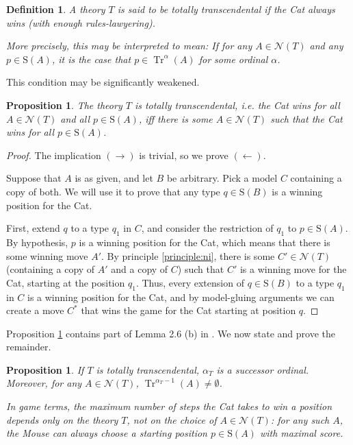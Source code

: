 \documentclass{article}
\newtheorem{prop}[theorem]{Proposition}
\newtheorem{definition}[theorem]{Definition}
\theoremstyle{nonumberplain}
\newtheorem{proof}{Proof}
\newcommand{\calN}{\mathcal{N}}
\newcommand{\Stone}{\mathrm{S}}
\DeclareMathOperator{\Tr}{Tr}
\begin{document}
\begin{definition}
A theory $T$ is said to be \emph{totally transcendental} if the Cat always wins (with enough rules-lawyering).

More precisely, this may be interpreted to mean: If for any $A \in \calN(T)$ and any $p \in \Stone(A)$, it is the case that $p \in \Tr^\alpha(A)$ for some ordinal $\alpha$.
\end{definition}

This condition may be significantly weakened.

\begin{prop}\label{prop:weaktt}
The theory $T$ is totally transcendental, i.e. the Cat wins for all $A \in \calN(T)$ and all $p \in \Stone(A)$, iff there is some $A \in \calN(T)$ such that the Cat wins for all $p \in \Stone(A)$.
\end{prop}

\begin{proof}
The implication $(\rightarrow)$ is trivial, so we prove $(\leftarrow)$.

Suppose that $A$ is as given, and let $B$ be arbitrary. Pick a model $C$ containing a copy of both. We will use it to prove that any type $q \in \Stone(B)$ is a winning position for the Cat.

First, extend $q$ to a type $q_1$ in $C$, and consider the restriction of $q_1$ to $p \in \Stone(A)$. By hypothesis, $p$ is a winning position for the Cat, which means that there is some winning move $A'$. By principle \ref{principle:ni}, there is some $C' \in \calN(T)$ (containing a copy of $A'$ and a copy of $C$) such that $C'$ is a winning move for the Cat, starting at the position $q_1$. Thus, every extension of $q \in \Stone(B)$ to a type $q_1$ in $C$ is a winning position for the Cat, and by model-gluing arguments we can create a move $C^*$ that wins the game for the Cat starting at position $q$.
\end{proof}

Proposition \ref{prop:weaktt} contains part of Lemma 2.6 (b) in \cite{morley}. We now state and prove the remainder.

\begin{prop}
If $T$ is totally transcendental, $\alpha_T$ is a successor ordinal. Moreover, for any $A \in \calN(T)$, $\Tr^{\alpha_T - 1}(A) \neq \emptyset$.

In game terms, the maximum number of steps the Cat takes to win a position depends only on the theory $T$, not on the choice of $A \in \calN(T)$: for any such $A$, the Mouse can always choose a starting position $p \in \Stone(A)$ with maximal score.
\end{prop}
\end{document}
